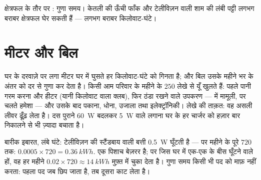 \begin{omfigure}

{\small क्षेत्रफल के तौर पर :  गुणा समय। केतली की ऊँची
फाँक और टेलीविज़न वाली शाम की लंबी पट्टी लगभग बराबर क्षेत्रफल घेर सकती
हैं --- लगभग बराबर किलोवाट-घंटे।}
\end{omfigure}

\section{मीटर और बिल}

\begin{example}[बिल पढ़ना]\label{ex:g9:electric-power-energy:bill}
घर के दरवाज़े पर लगा मीटर घर में घुसते हर किलोवाट-घंटे को गिनता है; और
बिल उसके महीने भर के अंतर को दर से गुणा कर देता है। किसी आम परिवार के
महीने के $250$  लेखे से यूँ खुलते हैं: पहले पानी गरम करना और
हीटर (यानी किलोवाट वाला क्लब), फिर ठंडा रखने वाले उपकरण ---  में
मामूली, पर चलते हमेशा --- और उसके बाद पकाना, धोना, उजाला तथा
इलेक्ट्रॉनिकी। लेखे की ताक़त: वह असली लीवर ढूँढ़ लेता है। दस पुराने
\qty{60}{W}  बदलकर \qty{5}{W} वाले लगाना घर के हर चार्जर को
हज़ार बार निकालने से भी ज़्यादा बचाता है।
\end{example}

\begin{example}[स्टैंडबाय वाले पिशाच]\label{ex:g9:electric-power-energy:standby}
बारीक इबारत, लंबे घंटे: टेलीविज़न की स्टैंडबाय वाली बत्ती
\qty{0.5}{W} घूँटती है --- पर महीने के पूरे $720$  तक:
$0.0005 \times 720 = \qty{0.36}{kWh}$. एक पिशाच बेज़रर है; पर जिस घर
में एक-एक  के बीस घूँटने वाले हों, वह हर महीने $0.02 \times 720
\approx \qty{14}{kWh}$ मुफ़्त में चुका देता है।  गुणा समय किसी
भी पद को माफ़ नहीं करता: पहला पद जब छिप जाता है, तब दूसरा काट लेता है।
\end{example}


